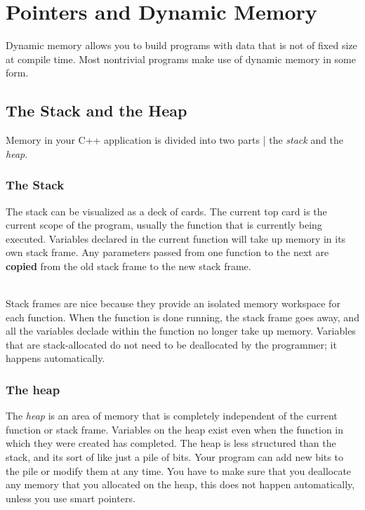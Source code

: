 \documentclass{article}
\begin{document}
\section{Pointers and Dynamic Memory}
Dynamic memory allows you to build programs with data that is not of fixed size at compile time.
Most nontrivial programs make use of dynamic memory in some form.
\subsection{The Stack and the Heap}
Memory in your C++ application is divided into two parts | the \textit{stack} and the \textit{heap}.
\subsubsection{The Stack}
The stack can be visualized as a deck of cards. The current top card is the current scope
of the program, usually the function that is currently being executed. Variables declared in the
current function will take up memory in its own stack frame. Any parameters passed from one function
to the next are \textbf{copied} from the old stack frame to the new stack frame.

\noindent \\ Stack frames are nice because they provide an isolated memory workspace for each function.
When the function is done running, the stack frame goes away, and all the variables declade within
the function no longer take up memory. Variables that are stack-allocated do not need to be deallocated
by the programmer; it happens automatically.
\subsubsection{The heap}
The \textit{heap} is an area of memory that is completely independent of the current function or
stack frame. Variables on the heap exist even when the function in which they were created has
completed. The heap is less structured than the stack, and its sort of like just a pile of bits.
Your program can add new bits to the pile or modify them at any time. You have to make sure
that you deallocate any memory that you allocated on the heap, this does not happen automatically,
unless you use smart pointers.
\end{document}
